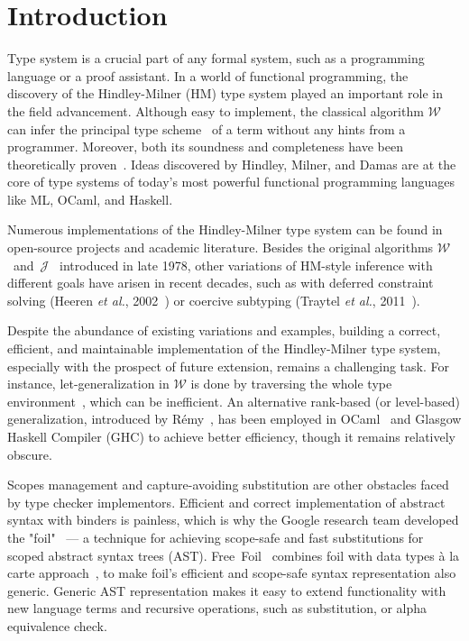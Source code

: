 \chapter{Introduction}
\label{chap:intro}

Type system is a crucial part of any formal system, such as a programming language or a proof assistant. In a world of functional programming, the discovery of the Hindley-Milner (HM) type system played an important role in the field advancement. Although easy to implement, the classical algorithm $\mathcal{W}$~\cite{Milner1978_TypePolymorphism} can infer the principal type scheme~\cite{Hindley1969_PrincipalTypeScheme} of a term without any hints from a programmer. Moreover, both its soundness and completeness have been theoretically proven~\cite{Damas1984_TypeAssignment}. Ideas discovered by Hindley, Milner, and Damas are at the core of type systems of today's most powerful functional programming languages like ML, OCaml, and Haskell.

Numerous implementations of the Hindley-Milner type system can be found in open-source projects and academic literature. Besides the original algorithms $\mathcal{W}$~and~$\mathcal{J}$~\cite{Milner1978_TypePolymorphism} introduced in late 1978, other variations of HM-style inference with different goals have arisen in recent decades, such as with deferred constraint solving (Heeren \textit{et al.}, 2002~\cite{Heeren2002_GeneralizingHM}) or coercive subtyping (Traytel \textit{et al.}, 2011~\cite{Traytel2011_HMCoerciveSubtyping}).

Despite the abundance of existing variations and examples, building a correct, efficient, and maintainable implementation of the Hindley-Milner type system, especially with the prospect of future extension, remains a challenging task. For instance, let-generalization in $\mathcal{W}$ is done by traversing the whole type environment~\cite{DamasMilner1982_TypeSchemes}, which can be inefficient. An alternative rank-based (or level-based) generalization, introduced by R\'emy~\cite{Remy1992_SortedEqTheoryTypes}, has been employed in OCaml~\cite{Kiselyov2022_OCamplTypeChecker} and Glasgow Haskell Compiler (GHC) to achieve better efficiency, though it remains relatively obscure.

Scopes management and capture-avoiding substitution are other obstacles faced by type checker implementors. Efficient and correct implementation of abstract syntax with binders is painless, which is why the Google research team developed the "foil"~\cite{Foil} — a technique for achieving scope-safe and fast substitutions for scoped abstract syntax trees (AST). Free~Foil~\cite{FreeFoil} combines foil with data types à la carte approach~\cite{Swierstra2008_a_la_carte}, to make foil's efficient and scope-safe syntax representation also generic. Generic AST representation makes it easy to extend functionality with new language terms and recursive operations, such as substitution, or alpha equivalence check.


